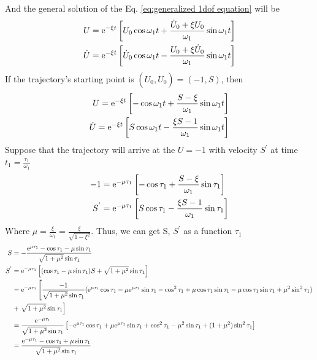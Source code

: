 \documentclass[a4paper,10pt]{article}
\begin{document}
	And the general solution of the Eq. \ref{eq:generalized 1dof equation} will be
	\begin{align}
	U={\rm e}^{-\xi t}\left [U_0\cos{\omega_1 t}+\frac{\dot U_0+\xi U_0}{\omega_1} \sin{\omega_1 t}  \right]\\
	\dot U={\rm e}^{-\xi t}\left[ \dot U_0 \cos{\omega_1 t}-\frac{U_0+\xi \dot U_0}{\omega_1} \sin{\omega_1 t}\right]
	\end{align}
	If the trajectory's starting point is $(U_0,\dot U_0)=(-1,S)$, then 
	\begin{align}
	U={\rm e}^{-\xi t}\left [-\cos{\omega_1 t}+\frac{S-\xi }{\omega_1} \sin{\omega_1 t}  \right]\\
	\dot U={\rm e}^{-\xi t}\left[ S \cos{\omega_1 t}-\frac{\xi S -1}{\omega_1} \sin{\omega_1 t}\right]
	\end{align}
	Suppose that the trajectory will arrive at the $U=-1$ with velocity $S^{'}$ at time $t_1=\frac{\tau_1}{\omega_1}$
	\begin{align}
	-1&={\rm e}^{-\mu \tau_1}\left [-\cos{\tau_1}+\frac{S-\xi }{\omega_1} \sin{\tau_1}  \right]\\
	S^{'}&={\rm e}^{-\mu \tau_1}\left[ S \cos{\tau_1}-\frac{\xi S -1}{\omega_1} \sin{\tau_1}\right]
	\end{align}
	Where $\displaystyle \mu = \frac{\xi}{\omega_1}=\frac{\xi}{\sqrt{1-\xi^2}}$. Thus, we can get S, $S^{'}$ as a function $\tau_1$
	\begin{align}
	S&=-\frac{{\rm e}^{\mu \tau_1}-\cos{\tau_1}-\mu \sin{\tau_1}}{\sqrt{1+\mu^2}\sin{\tau_1}} \label{eq: bounding velocity}\\ \nonumber
	S^{'}&={\rm e}^{-\mu \tau_1}\left[ (\cos{\tau_1-\mu\sin{\tau_1}})S+\sqrt{1+\mu^2}\sin{\tau_1}\right]\\ \nonumber
	&={\rm e}^{-\mu \tau_1} \left[ \frac{-1}{\sqrt{1+\mu^2}\sin{\tau_1}}  ({\rm e}^{\mu \tau_1}\cos{\tau_1}-\mu {\rm e}^{\mu \tau_1}\sin{\tau_1}-\cos^2{\tau_1}+\mu \cos{\tau_1}\sin{\tau_1}-\mu \cos{\tau_1}\sin{\tau_1}+\mu^2\sin^2{\tau_1}) \right. \\ \nonumber 
	& +
	\left. \sqrt{1+\mu^2}\sin{\tau_1} \right]\\ \nonumber
	&=\frac{{\rm e}^{-\mu \tau_1}}{\sqrt{1+\mu^2}\sin{\tau_1}}\left[ -{\rm e}^{\mu \tau_1}\cos{\tau_1}+\mu {\rm e}^{\mu \tau_1}\sin{\tau_1}+\cos^2{\tau_1}-\mu^2\sin{\tau_1}+(1+\mu^2)\sin^2{\tau_1}\right]\\
	&=\frac{{\rm e}^{-\mu \tau_1}-\cos{\tau_1}+\mu \sin{\tau_1}}{\sqrt{1+\mu^2}\sin{\tau_1}}
	\label{eq:hitting velocity}
	\end{align}
\end{document}
